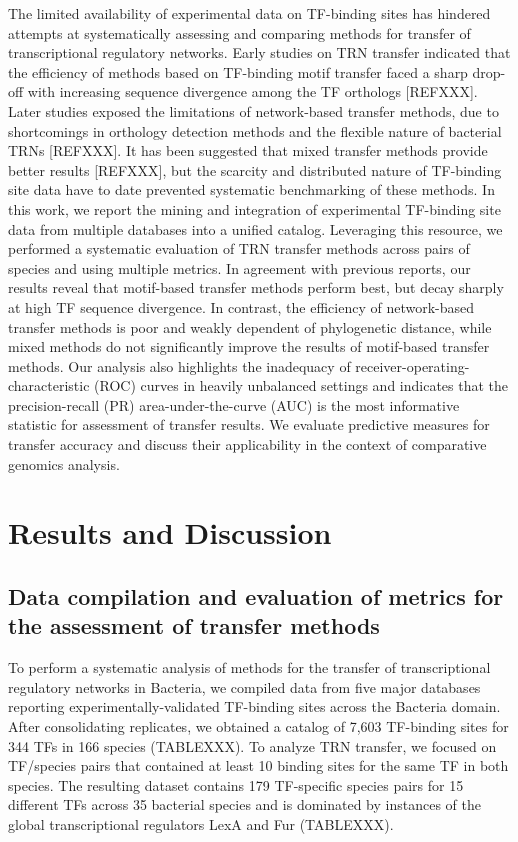 The limited availability of experimental data on TF-binding sites has hindered
attempts at systematically assessing and comparing methods for transfer of
transcriptional regulatory networks. Early studies on TRN transfer indicated
that the efficiency of methods based on TF-binding motif transfer faced a sharp
drop-off with increasing sequence divergence among the TF orthologs
[REFXXX]. Later studies exposed the limitations of network-based transfer
methods, due to shortcomings in orthology detection methods and the flexible
nature of bacterial TRNs [REFXXX]. It has been suggested that mixed transfer
methods provide better results [REFXXX], but the scarcity and distributed
nature of TF-binding site data have to date prevented systematic benchmarking
of these methods. In this work, we report the mining and integration of
experimental TF-binding site data from multiple databases into a unified
catalog. Leveraging this resource, we performed a systematic evaluation of TRN
transfer methods across pairs of species and using multiple metrics. In
agreement with previous reports, our results reveal that motif-based transfer
methods perform best, but decay sharply at high TF sequence divergence. In
contrast, the efficiency of network-based transfer methods is poor and weakly
dependent of phylogenetic distance, while mixed methods do not significantly
improve the results of motif-based transfer methods. Our analysis also
highlights the inadequacy of receiver-operating-characteristic (ROC) curves in
heavily unbalanced settings and indicates that the precision-recall (PR)
area-under-the-curve (AUC) is the most informative statistic for assessment of
transfer results. We evaluate predictive measures for transfer accuracy and
discuss their applicability in the context of comparative genomics analysis.


\section{Results and Discussion}

\subsection{Data compilation and evaluation of metrics for the assessment of
  transfer methods}

To perform a systematic analysis of methods for the transfer of transcriptional
regulatory networks in Bacteria, we compiled data from five major databases
reporting experimentally-validated TF-binding sites across the Bacteria
domain. After consolidating replicates, we obtained a catalog of 7,603
TF-binding sites for 344 TFs in 166 species (TABLEXXX). To analyze TRN
transfer, we focused on TF/species pairs that contained at least 10 binding
sites for the same TF in both species. The resulting dataset contains 179
TF-specific species pairs for 15 different TFs across 35 bacterial species and
is dominated by instances of the global transcriptional regulators LexA and Fur
(TABLEXXX).

